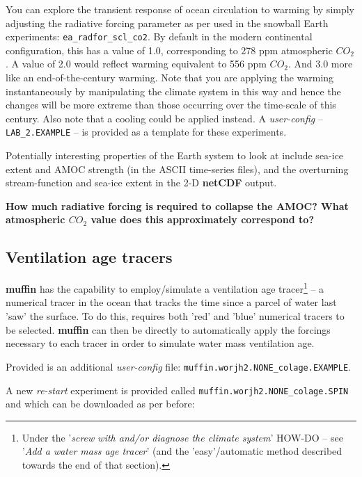 \documentclass[11pt,fleqn]{book} %
\begin{document}
You can explore the transient response of ocean circulation to warming by simply adjusting the radiative forcing parameter as per used in the snowball Earth experiments: \texttt{ea\_radfor\_scl\_co2}. By default in the modern continental configuration, this has a value of 1.0, corresponding to 278 ppm atmospheric \(CO_{2}\). A value of 2.0 would reflect warming equivalent to 556 ppm \(CO_{2}\). And 3.0 more like an end-of-the-century warming. Note that you are applying the warming instantaneously by manipulating the climate system in this way and hence the changes will be more extreme than those occurring over the time-scale of this century. Also note that a cooling could be applied instead. A \textit{user-config} – \texttt{LAB\_2.EXAMPLE} – is provided as a template for these experiments.

Potentially interesting properties of the Earth system to look at include sea-ice extent and AMOC strength (in the ASCII time-series files), and the overturning stream-function and sea-ice extent in the 2-D \textbf{netCDF} output.

\textbf{How much radiative forcing is required to collapse the AMOC? What atmospheric \(CO_{2}\) value does this approximately correspond to?
}


\subsection{Ventilation age tracers}

\textbf{muffin} has the capability to employ/simulate a ventilation age tracer\footnote{Under the '\textit{screw with and/or diagnose the climate system}' HOW-DO -- see '\textit{Add a water mass age tracer}' (and the 'easy'/automatic method described towards the end of that section).} -- a numerical tracer in the ocean that tracks the time since a parcel of water last 'saw' the surface. To do this, requires both 'red' and 'blue' numerical tracers to be selected.  \textbf{muffin} can then be directly to automatically apply the forcings necessary to each tracer in order to simulate water mass ventilation age.

Provided is an additional \textit{user-config} file: \texttt{muffin.worjh2.NONE\_colage.EXAMPLE}.

A new \textit{re-start} experiment is provided called \texttt{muffin.worjh2.NONE\_colage.SPIN} and which can be downloaded as per before:
\end{document}
